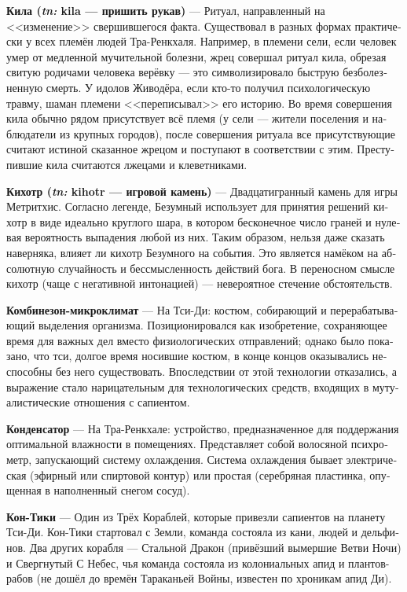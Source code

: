 \documentclass[a4paper,12pt,fleqn]{book}\usepackage{polyglossia}\setdefaultlanguage[babelshorthands=true]{russian}\setotherlanguage{english}\defaultfontfeatures{Ligatures=TeX,Mapping=tex-text}\usepackage{xcolor}\newcommand{\ml}[3]{#2}
\newcommand{\theterm}[3]{\textbf{\hypertarget{#1}{#2}} --- #3}
\newcommand{\theorigin}[3]{\textit{#1:} #2 --- #3}
\begin{document}
{\theterm{kila}
{Кила (\theorigin{tn}{kila}{пришить рукав})}
{Ритуал, направленный на <<изменение>> свершившегося факта.
Существовал в разных формах практически у всех племён людей Тра-Ренкхаля.
Например, в племени сели, если человек умер от медленной мучительной болезни, жрец совершал ритуал кила, обрезая свитую родичами человека верёвку --- это символизировало быструю безболезненную смерть.
У идолов Живодёра, если кто-то получил психологическую травму, шаман племени <<переписывал>> его историю.
Во время совершения кила обычно рядом присутствует всё племя (у сели --- жители поселения и наблюдатели из крупных городов), после совершения ритуала все присутствующие считают истиной сказанное жрецом и поступают в соответствии с этим.
Преступившие кила считаются лжецами и клеветниками.}

\theterm{kihotr}
{Кихотр (\theorigin{tn}{kihotr}{игровой камень})}
{Двадцатигранный камень для игры Метритхис.
Согласно легенде, Безумный использует для принятия решений кихотр в виде идеально круглого шара, в котором бесконечное число граней и нулевая вероятность выпадения любой из них.
Таким образом, нельзя даже сказать наверняка, влияет ли кихотр Безумного на события.
Это является намёком на абсолютную случайность и бессмысленность действий бога.
В переносном смысле кихотр (чаще с негативной интонацией) --- невероятное стечение обстоятельств.}

\theterm{microclimate-suit}
{Комбинезон-микроклимат}
{На Тси-Ди: костюм, собирающий и перерабатывающий выделения организма.
Позиционировался как изобретение, сохраняющее время для важных дел вместо физиологических отправлений;
однако было показано, что тси, долгое время носившие костюм, в конце концов оказывались неспособны без него существовать.
Впоследствии от этой технологии отказались, а выражение стало нарицательным для технологических средств, входящих в мутуалистические отношения с сапиентом.}

\theterm{condensor}
{Конденсатор}
{На Тра-Ренкхале: устройство, предназначенное для поддержания оптимальной влажности в помещениях.
Представляет собой волосяной психрометр, запускающий систему охлаждения.
Система охлаждения бывает электрическая (эфирный или спиртовой контур) или простая (серебряная пластинка, опущенная в наполненный снегом сосуд).}

\theterm{con-tici} %
{Кон-Тики}
{Один из Трёх Кораблей, которые привезли сапиентов на планету Тси-Ди.
Кон-Тики стартовал с Земли, команда состояла из кани, людей и дельфинов.
Два других корабля --- Стальной Дракон (привёзший вымершие Ветви Ночи) и Свергнутый С Небес, чья команда состояла из колониальных апид и плантов-рабов (не дошёл до времён Тараканьей Войны, известен по хроникам апид Ди).}

}
\end{document}
